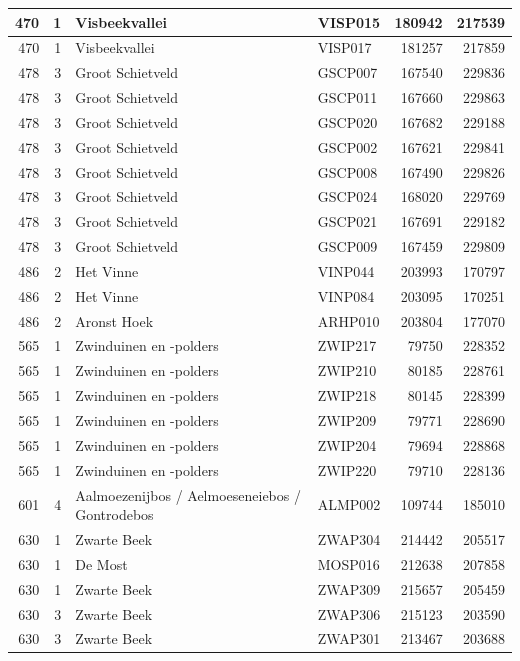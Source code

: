\documentclass[11pt,]{book}
\begin{document}
\begin{table}
\begin{tabular}[t]{r|r|l|l|r|r}
\hline
470 & 1 & Visbeekvallei & VISP015 & 180942 & 217539\\
\hline
470 & 1 & Visbeekvallei & VISP017 & 181257 & 217859\\
\hline
478 & 3 & Groot Schietveld & GSCP007 & 167540 & 229836\\
\hline
478 & 3 & Groot Schietveld & GSCP011 & 167660 & 229863\\
\hline
478 & 3 & Groot Schietveld & GSCP020 & 167682 & 229188\\
\hline
478 & 3 & Groot Schietveld & GSCP002 & 167621 & 229841\\
\hline
478 & 3 & Groot Schietveld & GSCP008 & 167490 & 229826\\
\hline
478 & 3 & Groot Schietveld & GSCP024 & 168020 & 229769\\
\hline
478 & 3 & Groot Schietveld & GSCP021 & 167691 & 229182\\
\hline
478 & 3 & Groot Schietveld & GSCP009 & 167459 & 229809\\
\hline
486 & 2 & Het Vinne & VINP044 & 203993 & 170797\\
\hline
486 & 2 & Het Vinne & VINP084 & 203095 & 170251\\
\hline
486 & 2 & Aronst Hoek & ARHP010 & 203804 & 177070\\
\hline
565 & 1 & Zwinduinen en -polders & ZWIP217 & 79750 & 228352\\
\hline
565 & 1 & Zwinduinen en -polders & ZWIP210 & 80185 & 228761\\
\hline
565 & 1 & Zwinduinen en -polders & ZWIP218 & 80145 & 228399\\
\hline
565 & 1 & Zwinduinen en -polders & ZWIP209 & 79771 & 228690\\
\hline
565 & 1 & Zwinduinen en -polders & ZWIP204 & 79694 & 228868\\
\hline
565 & 1 & Zwinduinen en -polders & ZWIP220 & 79710 & 228136\\
\hline
601 & 4 & Aalmoezenijbos / Aelmoeseneiebos / Gontrodebos & ALMP002 & 109744 & 185010\\
\hline
630 & 1 & Zwarte Beek & ZWAP304 & 214442 & 205517\\
\hline
630 & 1 & De Most & MOSP016 & 212638 & 207858\\
\hline
630 & 1 & Zwarte Beek & ZWAP309 & 215657 & 205459\\
\hline
630 & 3 & Zwarte Beek & ZWAP306 & 215123 & 203590\\
\hline
630 & 3 & Zwarte Beek & ZWAP301 & 213467 & 203688\\

\end{tabular}
\end{table}
\end{document}
